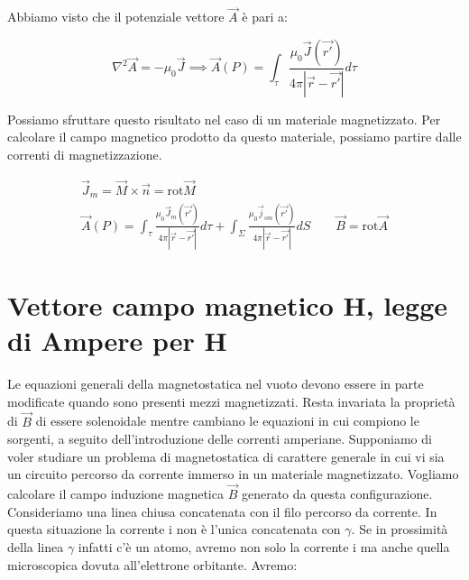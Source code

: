 \begin{figure}[htpb]
\end{figure}
\FloatBarrier

Abbiamo visto che il potenziale vettore $\vec{A}$ è pari a:

\[
	\nabla^2 \vec{A} = -\mu_0 \vec{J}  \implies  \vec{A} (P) = \int_{\tau}\frac{\mu_0 \vec{J} (\vec{r'} )}{4\pi |\vec{r} -\vec{r'} |}d\tau
\]

Possiamo sfruttare questo risultato nel caso di un materiale magnetizzato. Per calcolare il campo magnetico prodotto da questo materiale, possiamo partire dalle correnti di magnetizzazione.

\begin{gather*}
	\vec{J}_m=\vec{M} \times \vec{n} =\text{rot}\vec{M} \\
	\vec{A} (P) = \int_{\tau}\frac{\mu_0 \vec{J}_m  (\vec{r'} )}{4\pi |\vec{r} -\vec{r'} |}d\tau + \int_{\Sigma}\frac{\mu_0 \vec{j}_{sm}  (\vec{r'} )}{4\pi |\vec{r} -\vec{r'} |}dS \qquad \vec{B} =\text{rot}\vec{A}
\end{gather*}

\section{Vettore campo magnetico H, legge di Ampere per H}

Le equazioni generali della magnetostatica nel vuoto devono essere in parte modificate quando sono presenti mezzi magnetizzati. Resta invariata la proprietà di $\vec{B}$ di essere solenoidale mentre cambiano le equazioni in cui compiono le sorgenti, a seguito dell'introduzione delle correnti amperiane. Supponiamo di voler studiare un problema di magnetostatica di carattere generale in cui vi sia un circuito percorso da corrente immerso in un materiale magnetizzato. Vogliamo calcolare il campo induzione magnetica $\vec{B}$ generato da questa configurazione. Consideriamo una linea chiusa concatenata con il filo percorso da corrente. In questa situazione la corrente i non è l'unica concatenata con $\gamma$. Se in prossimità della linea $\gamma$ infatti c'è un atomo, avremo non solo la corrente i ma anche quella microscopica dovuta all'elettrone orbitante. Avremo:

